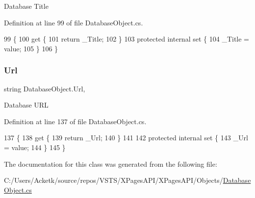 Database Title 



Definition at line 99 of file Database\+Object.\+cs.


\begin{DoxyCode}
99                         \{
100         \textcolor{keyword}{get} \{
101             \textcolor{keywordflow}{return} \_Title;
102         \}
103         \textcolor{keyword}{protected} \textcolor{keyword}{internal} \textcolor{keyword}{set} \{
104             \_Title = value;
105         \}
106     \}
\end{DoxyCode}
\mbox{\label{class_database_object_a12da011e3dc03d3a10ac86df10c84f48}} 
\subsubsection{\texorpdfstring{Url}{Url}}
{\footnotesize\ttfamily string Database\+Object.\+Url\hspace{0.3cm}{\ttfamily [get]}, {\ttfamily [set]}}



Database U\+RL 



Definition at line 137 of file Database\+Object.\+cs.


\begin{DoxyCode}
137                       \{
138         \textcolor{keyword}{get} \{
139             \textcolor{keywordflow}{return} \_Url;
140         \}
141 
142         \textcolor{keyword}{protected} \textcolor{keyword}{internal} \textcolor{keyword}{set} \{
143             \_Url = value;
144         \}
145     \}
\end{DoxyCode}


The documentation for this class was generated from the following file\+:\begin{DoxyCompactItemize}
\item 
C\+:/\+Users/\+Acketk/source/repos/\+V\+S\+T\+S/\+X\+Pages\+A\+P\+I/\+X\+Pages\+A\+P\+I/\+Objects/\mbox{\hyperlink{_database_object_8cs}{Database\+Object.\+cs}}\end{DoxyCompactItemize}
